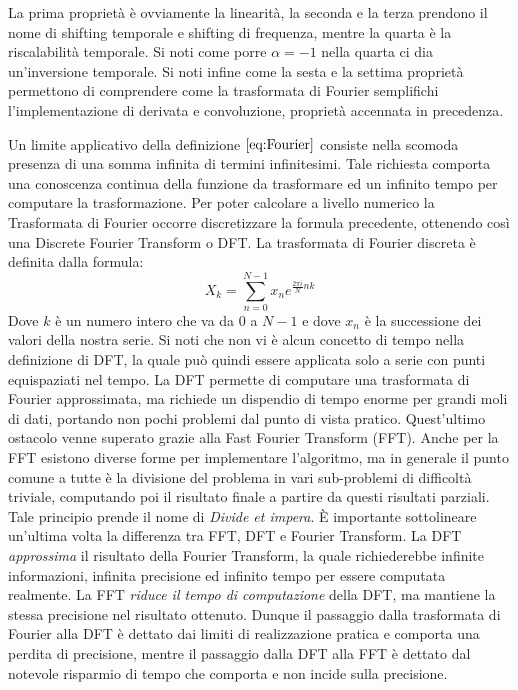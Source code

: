 \documentclass[a4paper, 12pt]{book}
\begin{document}
La prima proprietà è ovviamente la linearità, la seconda e la terza prendono il nome di shifting temporale e shifting di frequenza, mentre la quarta è la riscalabilità temporale.
Si noti come porre $\alpha = -1$ nella quarta ci dia un'inversione temporale.
Si noti infine come la sesta e la settima proprietà permettono di comprendere come la trasformata di Fourier semplifichi l'implementazione di derivata e convoluzione, proprietà accennata in precedenza.
\newline

Un limite applicativo della definizione $\ref{eq:Fourier}$ consiste nella scomoda presenza di una somma infinita di termini infinitesimi.
Tale richiesta comporta una conoscenza continua della funzione da trasformare ed un infinito tempo per computare la trasformazione.
Per poter calcolare a livello numerico la Trasformata di Fourier occorre discretizzare la formula precedente, ottenendo così una Discrete Fourier Transform o DFT.
La trasformata di Fourier discreta è definita dalla formula:
\begin{equation}
	\label{eq:DFT}
	X_k=\sum_{n=0}^{N-1} x_ne^{\frac{2 \pi i}{N} nk}
\end{equation}
Dove $k$ è un numero intero che va da 0 a $N-1$ e dove $x_n$ è la successione dei valori della nostra serie.
Si noti che non vi è alcun concetto di tempo nella definizione di DFT, la quale può quindi essere applicata solo a serie con punti equispaziati nel tempo.
La DFT permette di computare una trasformata di Fourier approssimata, ma richiede un dispendio di tempo enorme per grandi moli di dati, portando non pochi problemi dal punto di vista pratico.
Quest'ultimo ostacolo venne superato grazie alla Fast Fourier Transform (FFT).
Anche per la FFT esistono diverse forme per implementare l'algoritmo, ma in generale il punto comune a tutte è la divisione del problema in vari sub-problemi di difficoltà triviale, computando poi il risultato finale a partire da questi risultati parziali.
Tale principio prende il nome di \textit{Divide et impera}.
È importante sottolineare un'ultima volta la differenza tra FFT, DFT e Fourier Transform.
La DFT \textit{approssima} il risultato della Fourier Transform, la quale richiederebbe infinite informazioni, infinita precisione ed infinito tempo per essere computata realmente.
La FFT \textit{riduce il tempo di computazione} della DFT, ma mantiene la stessa precisione nel risultato ottenuto.
Dunque il passaggio dalla trasformata di Fourier alla DFT è dettato dai limiti di realizzazione pratica e comporta una perdita di precisione, mentre il passaggio dalla DFT alla FFT è dettato dal notevole risparmio di tempo che comporta e non incide sulla precisione.
\end{document}
